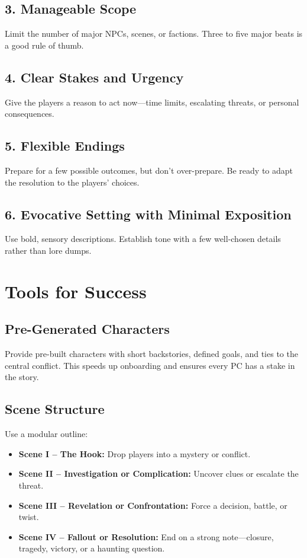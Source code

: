\subsection*{3. Manageable Scope}
Limit the number of major NPCs, scenes, or factions. Three to five major beats is a good rule of thumb.

\subsection*{4. Clear Stakes and Urgency}
Give the players a reason to act now—time limits, escalating threats, or personal consequences.

\subsection*{5. Flexible Endings}
Prepare for a few possible outcomes, but don’t over-prepare. Be ready to adapt the resolution to the players’ choices.

\subsection*{6. Evocative Setting with Minimal Exposition}
Use bold, sensory descriptions. Establish tone with a few well-chosen details rather than lore dumps.

\section{Tools for Success}

\subsection*{Pre-Generated Characters}
Provide pre-built characters with short backstories, defined goals, and ties to the central conflict. This speeds up onboarding and ensures every PC has a stake in the story.

\subsection*{Scene Structure}
Use a modular outline:
\begin{itemize}
    \item \textbf{Scene I – The Hook:} Drop players into a mystery or conflict.
    \item \textbf{Scene II – Investigation or Complication:} Uncover clues or escalate the threat.
    \item \textbf{Scene III – Revelation or Confrontation:} Force a decision, battle, or twist.
    \item \textbf{Scene IV – Fallout or Resolution:} End on a strong note—closure, tragedy, victory, or a haunting question.
\end{itemize}

